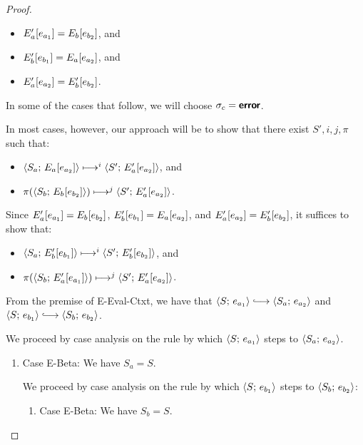 \begin{proof}
  \begin{itemize}
  \item $E'_a\hspace{-0.5mm}\left[e_{a_1}\right] = E_b\hspace{-0.5mm}\left[e_{b_2}\right]$, and
  \item $E'_b\hspace{-0.5mm}\left[e_{b_1}\right] = E_a\hspace{-0.5mm}\left[e_{a_2}\right]$, and
  \item $E'_a\hspace{-0.5mm}\left[e_{a_2}\right] = E'_b\hspace{-0.5mm}\left[e_{b_2}\right]$.
  \end{itemize}

  In some of the cases that follow, we will choose $\sigma_c = \textbf{\textsf{error}}$.

  In most cases, however, our approach will be to show that there
  exist $S', i, j, \pi$ such that:
  \begin{itemize}
  \item $\langle S_a;\, E_a\hspace{-0.5mm}\left[e_{a_2}\right] \rangle \longmapsto^i
    \langle S';\, E'_a\hspace{-0.5mm}\left[e_{a_2}\right] \rangle$, and
  \item $\pi(\langle S_b;\, E_b\hspace{-0.5mm}\left[e_{b_2}\right] \rangle) \longmapsto^j
    \langle S';\, E'_a\hspace{-0.5mm}\left[e_{a_2}\right] \rangle$.
  \end{itemize}
  Since $E'_a\hspace{-0.5mm}\left[e_{a_1}\right] = E_b\hspace{-0.5mm}\left[e_{b_2}\right]$,
  $E'_b\hspace{-0.5mm}\left[e_{b_1}\right] = E_a\hspace{-0.5mm}\left[e_{a_2}\right]$, and
  $E'_a\hspace{-0.5mm}\left[e_{a_2}\right] = E'_b\hspace{-0.5mm}\left[e_{b_2}\right]$, it suffices
  to show that:
  \begin{itemize}
  \item $\langle S_a;\, E'_b\hspace{-0.5mm}\left[e_{b_1}\right] \rangle \longmapsto^i
    \langle S';\, E'_b\hspace{-0.5mm}\left[e_{b_2}\right] \rangle$, and
  \item $\pi(\langle S_b;\, E'_a\hspace{-0.5mm}\left[e_{a_1}\right] \rangle) \longmapsto^j
    \langle S';\, E'_a\hspace{-0.5mm}\left[e_{a_2}\right] \rangle$.
  \end{itemize}

  From the premise of {\sc E-Eval-Ctxt}, we have that
  $\config{S}{e_{a_1}} \parstepsto \config{S_a}{e_{a_2}}$ and
  $\config{S}{e_{b_1}} \parstepsto \config{S_b}{e_{b_2}}$.

  We proceed by case analysis on the rule by which
  $\langle S;\, e_{a_1} \rangle$ steps to $\langle S_a;\, e_{a_2} \rangle$.

  \begin{enumerate}
  \item Case {\sc E-Beta}: We have $S_a = S$.

    We proceed by case analysis on the rule by which
    $\langle S;\, e_{b_1} \rangle$ steps to $\langle S_b;\, e_{b_2} \rangle$:
    \begin{enumerate}
    \item \label{lvars-slc-beta-beta}Case {\sc E-Beta}: We have $S_b =
      S$.


\end{enumerate}
\end{enumerate}
\end{proof}
